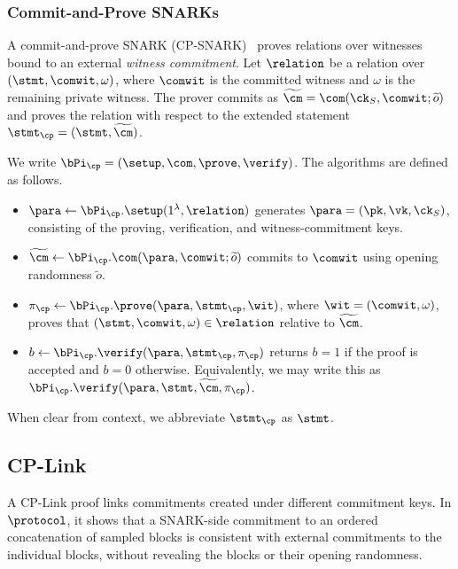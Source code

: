 \subsubsection{Commit-and-Prove SNARKs}
A commit-and-prove SNARK (CP-SNARK)~\cite{gnark,legosnark} proves relations
over witnesses bound to an external \emph{witness commitment}. Let
\(\relation\) be a relation over \((\stmt,\comwit,\omega)\), where
\(\comwit\) is the committed witness and \(\omega\) is the remaining private
witness. The prover commits as
\(\widetilde{\cm}=\com(\ck_S,\comwit;\widetilde{o})\) and proves the relation
with respect to the extended statement
\(\stmt_{\cp}=(\stmt,\widetilde{\cm})\).

We write \(\bPi_{\cp}=(\setup,\com,\prove,\verify)\). The algorithms are
defined as follows.
\begin{itemize}[leftmargin=*,nosep]
  \item \(\para\gets\bPi_{\cp}.\setup(1^\lambda,\relation)\) generates
  \(\para=(\pk,\vk,\ck_S)\), consisting of the proving, verification, and
  witness-commitment keys.

  \item \(\widetilde{\cm}\gets
  \bPi_{\cp}.\com(\para,\comwit;\widetilde{o})\) commits to \(\comwit\) using
  opening randomness \(\widetilde{o}\).

  \item \(\pi_{\cp}\gets
  \bPi_{\cp}.\prove(\para,\stmt_{\cp},\wit)\), where
  \(\wit=(\comwit,\omega)\), proves that
  \((\stmt,\comwit,\omega)\in\relation\) relative to
  \(\widetilde{\cm}\).

  \item \(b\gets
  \bPi_{\cp}.\verify(\para,\stmt_{\cp},\pi_{\cp})\) returns \(b=1\) if the
  proof is accepted and \(b=0\) otherwise. Equivalently, we may write this as
  \(\bPi_{\cp}.\verify(\para,\stmt,\widetilde{\cm},\pi_{\cp})\).
\end{itemize}
When clear from context, we abbreviate \(\stmt_{\cp}\) as \(\stmt\).
\subsection{CP-Link}
\label{sec:prelim-cplink}

A CP-Link proof links commitments created under different commitment keys. In
\(\protocol\), it shows that a SNARK-side commitment to an ordered
concatenation of sampled blocks is consistent with external commitments to the
individual blocks, without revealing the blocks or their opening randomness.

